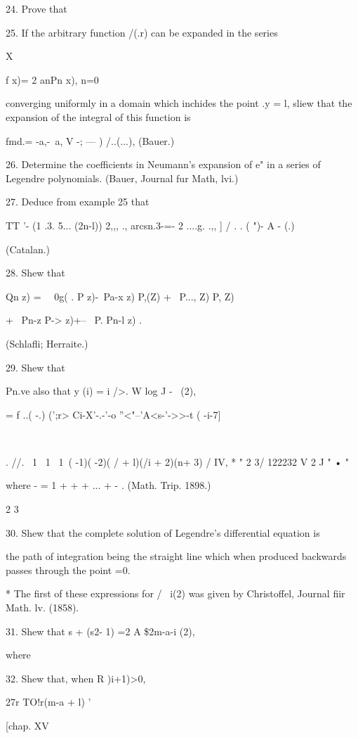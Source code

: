 {{{{24. Prove that


25. If the arbitrary function /(.r) can be expanded in the series

X

f x)= 2 anPn x), n=0

converging uniformly in a domain which inchides the point .y = l,
sliew that the expansion of the integral of this function is

fmd.= -a,-\ a, V -; --- ) /..(...), (Bauer.)

26. Determine the coefficients in Neumann's expansion of e" in a
series of Legendre polynomials. (Bauer, Journal fur Math, lvi.)

27. Deduce from example 25 that

TT '- (1 .3. 5... (2n-l)) 2,,, ., arcsn.3-=- 2 ....g. .,, ] / . . (
")- A - (.)

(Catalan.)

28. Shew that

Qn z) = \ \ 0g( . P z)-\ Pa-x z) P,(Z) + \ P..., Z) P, Z)

+ \ Pn-z P-> z)+-- \ P. Pn-l z) .

(Schlafli; Herraite.)

29. Shew that

Pn.ve also that y (i) = i />. W log J - \, (2),

= f ..( -.) (';r> Ci-X'-.-'-o ''<"--'A<s-'->>-t ( -i-7]

\

. //. \ 1 \ 1 \ 1\ ( -1)( -2)( / + l)(/i + 2)(n+ 3) / IV, * " 2 3/
122232 V 2 J " • "

where - = 1 + + + ... + - . (Math. Trip. 1898.)

2 3

30. Shew that the complete solution of Legendre's differential
equation is

the path of integration being the straight line which when produced
backwards passes through the point =0.

* The first of these expressions for / \ i(2) was given by
Christoffel, Journal fiir Math. lv. (1858).

%
%

31. Shew that s + (s2- 1) =2 A \$2m-a-i (2),

where

32. Shew that, when R )i+1)>0,

27r TO!r(m-a + l) '

[chap. XV

}}}}
